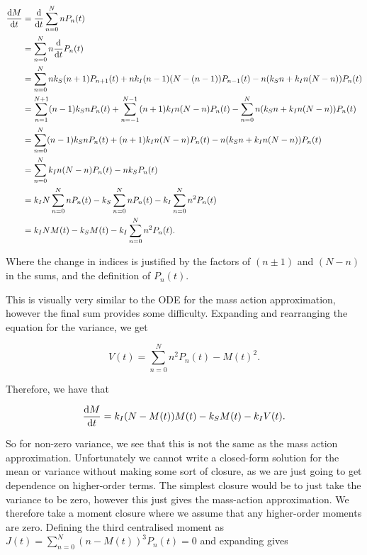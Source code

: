 \documentclass[12pt,a4paper,openany,twoside]{book}
\renewcommand{\d}{{\mathrm d}}
\newcommand{\fd}[2]{\mathchoice{\frac{\d #1}{\d #2}}{\d #1/\d #2}{\d #1/\d #2}{\d #1/\d #2}}
\begin{document}
\begin{equation}
\begin{aligned}
	\fd {M} {t} &= \fd {} {t} \sum_{n = 0}^N n P_n(t) \\
	&= \sum_{n = 0}^N n \fd {} {t} P_n(t) \\
	&= \sum_{n = 0}^N n k_S (n+1) P_{n+1} (t) + n k_I (n-1)(N - (n-1)) P_{n-1} (t) - n (k_S n + k_I n (N-n)) P_n(t) \\
	&= \sum_{n = 1}^{N+1} (n-1) k_S n P_n(t) + \sum_{n=-1}^{N-1} (n+1) k_I n (N-n) P_n(t) - \sum_{n=0}^N n (k_S n + k_I n (N-n)) P_n(t) \\
	&= \sum_{n=0}^N (n-1) k_S n P_n(t) + (n+1) k_I n (N-n) P_n(t) - n (k_S n + k_I n (N-n)) P_n(t) \\
	&= \sum_{n=0}^N k_I n (N-n) P_n(t)-n k_S P_n(t) \\
	&= k_I N \sum_{n=0}^N n P_n(t) - k_S \sum_{n=0}^N n P_n(t) - k_I \sum_{n=0}^N n^2 P_n(t) \\
	&= k_I N M(t) - k_S M(t) - k_I \sum_{n=0}^N n^2 P_n(t). \label{SISmixmean}
\end{aligned}
\end{equation}

Where the change in indices is justified by the factors of $(n \pm 1)$ and $(N-n)$ in the sums, and the definition of $P_n(t)$.

This is visually very similar to the ODE for the mass action approximation, however the final sum provides some difficulty. Expanding and rearranging the equation for the variance, we get

\begin{equation}
	V(t) = \sum_{n=0}^N n^2 P_n(t) - M(t)^2. \label{variancesquare}
\end{equation}

Therefore, we have that

\begin{equation}
	\fd {M} {t} = k_I(N - M(t)) M(t) - k_S M(t) - k_I V(t).
\end{equation}

So for non-zero variance, we see that this is not the same as the mass action approximation. Unfortunately we cannot write a closed-form solution for the mean or variance without making some sort of closure, as we are just going to get dependence on higher-order terms. The simplest closure would be to just take the variance to be zero, however this just gives the mass-action approximation. We therefore take a moment closure \citep{kuehnMomentClosureBrief2016} where we assume that any higher-order moments are zero. Defining the third centralised moment as $J(t) = \sum_{n = 0}^N (n-M(t))^3 P_n(t) = 0$ and expanding gives
\end{document}
